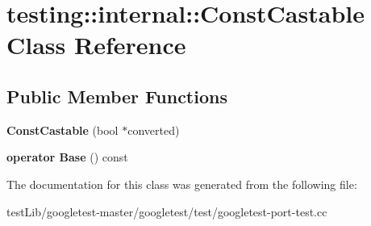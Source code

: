 \hypertarget{classtesting_1_1internal_1_1ConstCastable}{}\section{testing\+:\+:internal\+:\+:Const\+Castable Class Reference}
\label{classtesting_1_1internal_1_1ConstCastable}
\subsection*{Public Member Functions}
\begin{DoxyCompactItemize}
\item 
\mbox{\label{classtesting_1_1internal_1_1ConstCastable_a78eba470cc71528237a33a10a92fba7e}} 
{\bfseries Const\+Castable} (bool $\ast$converted)
\item 
\mbox{\label{classtesting_1_1internal_1_1ConstCastable_af084893d6786010022297b1e88f4743b}} 
{\bfseries operator Base} () const
\end{DoxyCompactItemize}


The documentation for this class was generated from the following file\+:\begin{DoxyCompactItemize}
\item 
test\+Lib/googletest-\/master/googletest/test/googletest-\/port-\/test.\+cc\end{DoxyCompactItemize}
